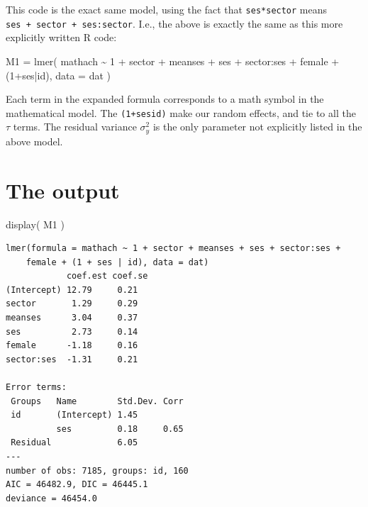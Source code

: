 \documentclass[
  letterpaper,
  DIV=11,
  numbers=noendperiod]{scrreprt}
\newenvironment{Shaded}{}{}
\newcommand{\AttributeTok}[1]{\textcolor[rgb]{0.49,0.56,0.16}{#1}}
\newcommand{\DecValTok}[1]{\textcolor[rgb]{0.25,0.63,0.44}{#1}}
\newcommand{\FunctionTok}[1]{\textcolor[rgb]{0.02,0.16,0.49}{#1}}
\newcommand{\NormalTok}[1]{#1}
\newcommand{\OtherTok}[1]{\textcolor[rgb]{0.00,0.44,0.13}{#1}}
\newcommand{\SpecialCharTok}[1]{\textcolor[rgb]{0.25,0.44,0.63}{#1}}
\begin{document}
This code is the exact same model, using the fact that
\texttt{ses*sector} means \texttt{ses\ +\ sector\ +\ ses:sector}. I.e.,
the above is exactly the same as this more explicitly written R code:

\begin{Shaded}
\begin{Highlighting}[]
\NormalTok{M1 }\OtherTok{=} \FunctionTok{lmer}\NormalTok{( mathach }\SpecialCharTok{\textasciitilde{}} \DecValTok{1} \SpecialCharTok{+}\NormalTok{ sector }\SpecialCharTok{+}\NormalTok{ meanses }\SpecialCharTok{+}\NormalTok{ ses }\SpecialCharTok{+}\NormalTok{ sector}\SpecialCharTok{:}\NormalTok{ses }\SpecialCharTok{+}\NormalTok{ female }\SpecialCharTok{+}\NormalTok{ (}\DecValTok{1}\SpecialCharTok{+}\NormalTok{ses}\SpecialCharTok{|}\NormalTok{id),}
           \AttributeTok{data =}\NormalTok{ dat )}
\end{Highlighting}
\end{Shaded}

Each term in the expanded formula corresponds to a math symbol in the
mathematical model. The \texttt{(1+ses\textbar{}id)} make our random
effects, and tie to all the \(\tau\) terms. The residual variance
\(\sigma^2_y\) is the only parameter not explicitly listed in the above
model.

\section{The output}\label{the-output}

\begin{Shaded}
\begin{Highlighting}[]
\FunctionTok{display}\NormalTok{( M1 )}
\end{Highlighting}
\end{Shaded}

\begin{verbatim}
lmer(formula = mathach ~ 1 + sector + meanses + ses + sector:ses + 
    female + (1 + ses | id), data = dat)
            coef.est coef.se
(Intercept) 12.79     0.21  
sector       1.29     0.29  
meanses      3.04     0.37  
ses          2.73     0.14  
female      -1.18     0.16  
sector:ses  -1.31     0.21  

Error terms:
 Groups   Name        Std.Dev. Corr 
 id       (Intercept) 1.45          
          ses         0.18     0.65 
 Residual             6.05          
---
number of obs: 7185, groups: id, 160
AIC = 46482.9, DIC = 46445.1
deviance = 46454.0 
\end{verbatim}
\end{document}
